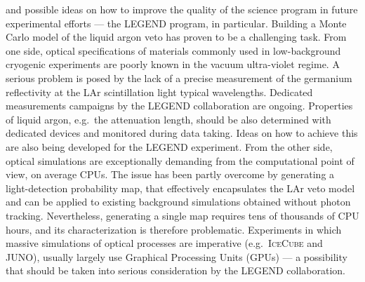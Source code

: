 and possible ideas on how to improve the quality of the science program in future
experimental efforts --- the LEGEND program, in particular. Building a Monte Carlo model
of the liquid argon veto has proven to be a challenging task. From one side, optical
specifications of materials commonly used in low-background cryogenic experiments are
poorly known in the vacuum ultra-violet regime. A serious problem is posed by the lack of
a precise measurement of the germanium reflectivity at the LAr scintillation light typical
wavelengths. Dedicated measurements campaigns by the LEGEND collaboration are ongoing.
Properties of liquid argon, e.g.~the attenuation length, should be also determined with
dedicated devices and monitored during data taking. Ideas on how to achieve this are also
being developed for the LEGEND experiment. From the other side, optical simulations are
exceptionally demanding from the computational point of view, on average CPUs. The issue
has been partly overcome by generating a light-detection probability map, that effectively
encapsulates the LAr veto model and can be applied to existing background simulations
obtained without photon tracking. Nevertheless, generating a single map requires tens of
thousands of CPU hours, and its characterization is therefore problematic. Experiments
in which massive simulations of optical processes are imperative (e.g.~\textsc{IceCube}
and JUNO), usually largely use Graphical Processing Units (GPUs) --- a possibility that
should be taken into serious consideration by the LEGEND collaboration.

\chapendgliph{}

